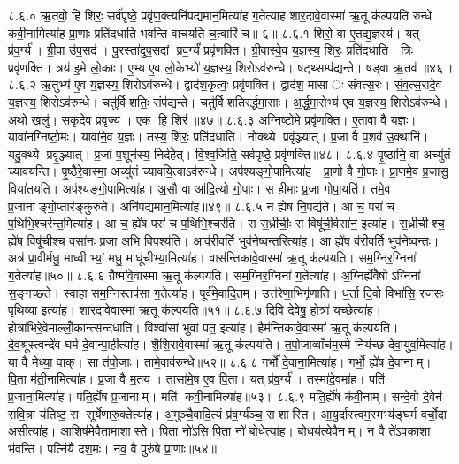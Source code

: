 ८.६.०
ऋ॒तवो॒ हि शिरः॒ सर्व॑पृष्ठे॒ प्रवृ॑ण॒क्त्यनि॑पद्यमान॒मित्या॑ह ग॒तेत्या॑ह शार॒दावे॒वास्मा॑ ऋ॒तू क॑ल्पयति रुन्धे कवी॒नामित्या॑ह प्रा॒णाः प्रति॑दधाति भवन्ति वाचयति च॒त्वारि॑ च॥ ६॥
८.६.१
शिरो॒ वा ए॒तद्य॒ज्ञस्य॑। यत् प्र॑व॒र्ग्य॑। ग्री॒वा उ॑प॒सद॑। पु॒रस्ता॑दुप॒सदां प्रव॒र्ग्यं॑ प्रवृ॑णक्ति। ग्री॒वास्वे॒व य॒ज्ञस्य॒ शिरः॒ प्रति॑दधाति। त्रिः प्रवृ॑णक्ति। त्रय॑ इ॒मे लो॒काः। ए॒भ्य ए॒व लो॒केभ्यो॑ य॒ज्ञस्य॒ शिरोऽव॑रुन्धे। षट्थ्सम्प॑द्यन्ते। षड्वा ऋ॒तव॑॥४६॥
८.६.२
ऋ॒तुभ्य॑ ए॒व य॒ज्ञस्य॒ शिरोऽव॑रुन्धे। द्वाद॑श॒कृत्वः॒ प्रवृ॑णक्ति। द्वाद॑श॒ मासाः संवत्स॒रः। सं॒व॒त्स॒रादे॒व य॒ज्ञस्य॒ शिरोऽव॑रुन्धे। चतु॑र्विशतिः॒ संप॑द्यन्ते। चतु॑र्विशतिरर्द्धमा॒साः। अ॒र्द्ध॒मा॒सेभ्य॑ ए॒व य॒ज्ञस्य॒ शिरोऽव॑रुन्धे। अथो॒ खलु॑। स॒कृदे॒व प्र॒वृज्य॑। एक॒ हि शिर॑॥४७॥
८.६.३
अ॒ग्नि॒ष्टो॒मे प्रवृ॑णक्ति। ए॒तावा॒\an{} वै य॒ज्ञः। यावा॑नग्निष्टो॒मः। यावा॑ने॒व य॒ज्ञः। तस्य॒ शिरः॒ प्रति॑दधाति। नोक्थ्ये प्रवृ॑ञ्ज्यात्। प्र॒जा वै प॒शव॑ उ॒क्थानि॑। यदु॒क्थ्ये प्रवृ॒ञ्ज्यात्। प्र॒जां प॒शून॑स्य॒ निर्द॑हेत्। वि॒श्व॒जिति॒ सर्व॑पृष्ठे॒ प्रवृ॑णक्ति॥४८॥
८.६.४
पृ॒ष्ठानि॒ वा अच्यु॑तं च्यावयन्ति। पृ॒ष्ठैरे॒वास्मा॒ अच्यु॑तं च्यावयि॒त्वाऽव॑रुन्धे। अप॑श्यङ्गो॒पामित्या॑ह। प्रा॒णो वै गो॒पाः। प्रा॒णमे॒व प्र॒जासु॒ विया॑तयति। अप॑श्यङ्गो॒पामित्या॑ह। अ॒सौ वा आ॑दि॒त्यो गो॒पाः। स हीमाः प्र॒जा गो॑पा॒यति॑। तमे॒व प्र॒जानाङ्गो॒प्तार॑ङ्कुरुते। अनि॑पद्यमान॒मित्या॑ह॥४९॥
८.६.५
न ह्ये॑ष नि॒पद्य॑ते। आ च॒ परा॑ च प॒थिभि॒श्चर॑न्त॒मित्या॑ह। आ च॒ ह्ये॑ष परा॑ च प॒थिभि॒श्चर॑ति। स स॒ध्रीचीः॒ स विषू॑ची॒र्वसा॑न॒ इत्या॑ह। स॒ध्रीचीश्च॒ ह्ये॑ष विषू॑चीश्च॒ वसा॑नः प्र॒जा अ॒भि वि॒पश्य॑ति। आव॑रीवर्ति॒ भुव॑नेष्व॒न्तरित्या॑ह। आ ह्ये॑ष व॑री॒वर्ति॒ भुव॑नेष्व॒न्तः। अत्र॑ प्रा॒वीर्मधु॒ माध्वीभ्यां॒ मधु॒ माधू॑चीभ्या॒मित्या॑ह। वास॑न्तिकावे॒वास्मा॑ ऋ॒तू क॑ल्पयति। सम॒ग्निर॒ग्निना॑ ग॒तेत्या॑ह॥५०॥
८.६.६
ग्रैष्मा॑वे॒वास्मा॑ ऋ॒तू क॑ल्पयति। सम॒ग्निर॒ग्निना॑ ग॒तेत्या॑ह। अ॒ग्निर्ह्ये॑वैषोऽग्निना॑ स॒ङ्गच्छ॑ते। स्वाहा॒ सम॒ग्निस्तप॑सा ग॒तेत्या॑ह। पूर्व॑मे॒वादि॒तम्। उत्त॑रेणा॒भिगृ॑णाति। ध॒र्ता दि॒वो विभा॑सि॒ रज॑सः पृथि॒व्या इत्या॑ह। शा॒र॒दावे॒वास्मा॑ ऋ॒तू क॑ल्पयति॥५१॥
८.६.७
दि॒वि दे॒वेषु॒ होत्रा॑ य॒च्छेत्या॑ह। होत्रा॑भिरे॒वेमाल्लोँ॒कान्त्सन्द॑धाति। विश्वा॑सां भुवां पत॒ इत्या॑ह। हैम॑न्तिकावे॒वास्मा॑ ऋ॒तू क॑ल्पयति। दे॒व॒श्रूस्त्वन्दे॑व घर्म दे॒वान्पा॒हीत्या॑ह। शै॒शि॒रावे॒वास्मा॑ ऋ॒तू क॑ल्पयति। त॒पो॒जाव्वाँच॑म॒स्मे निय॑च्छ देवा॒युव॒मित्या॑ह। या वै मेध्या॒ वाक्। सा त॑पो॒जाः। तामे॒वाव॑रुन्धे॥५२॥
८.६.८
गर्भो॑ दे॒वाना॒मित्या॑ह। गर्भो॒ ह्ये॑ष दे॒वानाम्। पि॒ता म॑ती॒नामित्या॑ह। प्र॒जा वै म॒तय॑। तासा॑मे॒ष ए॒व पि॒ता। यत् प्र॑व॒र्ग्य॑। तस्मा॑दे॒वमा॑ह। पति॑ प्र॒जाना॒मित्या॑ह। पति॒र्ह्ये॑ष प्र॒जानाम्। मति॑ कवी॒नामित्या॑ह॥५३॥
८.६.९
मति॒र्ह्ये॑ष क॑वी॒नाम्। सन्दे॒वो दे॒वेन॑ सवि॒त्रा य॑तिष्ट॒ स सूर्ये॑णारु॒क्तेत्या॑ह। अ॒मुञ्चै॒वादि॒त्यं प्र॑व॒र्ग्य॑ञ्च॒ सशास्ति। आ॒यु॒र्दास्त्वम॒स्मभ्य॑ङ्घर्म वर्चो॒दा अ॒सीत्या॑ह। आ॒शिष॑मे॒वैतामाशास्ते। पि॒ता नो॑ऽसि पि॒ता नो॑ बो॒धेत्या॑ह। बो॒धय॑त्ये॒वैनम्। न वै॒ ते॑ऽवका॒शा भ॑वन्ति। पत्नि॑यै दश॒मः। नव॒ वै पुरु॑षे प्रा॒णाः॥५४॥
